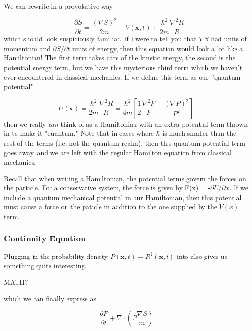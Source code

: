We can rewrite  in a provokative way 

\begin{equation}
\label{BohmHamiltonian}
- \frac{\partial S}{\partial t} = \frac{(\nabla S)^2}{2 m} + V(\mathbf{x},t) + \frac{\hbar^2}{2m}\frac{\nabla^2 R}{R}
\end{equation}
which should look suspiciously familiar. If I were to tell you that $\nabla S$ had units of momentum and $\partial S/\partial t$ units of energy, then this equation would look a lot like a Hamiltonian! The first term takes care of the kinetic energy, the second is the potential energy term, but we have this mysterious third term which we haven't ever encountered in classical mechanics. If we define this term as our ''quantum potential" 

\begin{equation}
\label{QuantumPotential}
U(\mathbf{x}) =  \frac{\hbar^2}{2m}\frac{\nabla^2 R}{R} = \frac{\hbar^2}{4m}\left[\frac{1}{2} \frac{\nabla^2 P}{P} - \frac{(\nabla P)^2}{P^2}\right] 
\end{equation}
then we really \textit{can} think of  as a Hamiltonian with an extra potential term thrown in to make it "quantum." Note that in cases where $\hbar$ is much smaller than the rest of the terms (i.e. not the quantum realm), then this quantum potential term goes away, and we are left with the regular Hamilton equation from classical mechanics. 

Recall that when writing a Hamiltonian, the potential terms govern the forces on the particle. For a conservative system, the force is given by F(x) = -$\partial U/\partial x$. If we include a quantum mechanical potential in our Hamiltonian, then this potential must cause a force on the paticle in addition to the one supplied by the $V(x)$ term. 


\subsubsection{Continuity Equation}
Plugging in the probability density $P(\mathbf{x},t) = R^2(\mathbf{x},t)$ into  also gives us something quite interesting.

MATH?

which we can finally express as 

\begin{equation}
\label{ProbCurrent}
\frac{\partial P}{\partial t} + \nabla \cdot \left( P \frac{\nabla S}{m} \right)
\end{equation}

